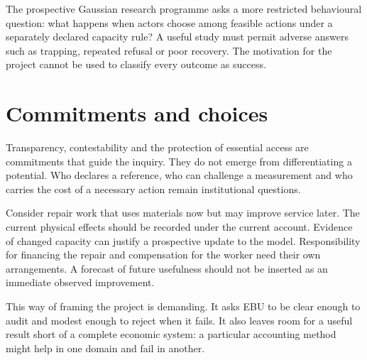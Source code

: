 The prospective Gaussian research programme asks a more restricted behavioural question: what happens when actors choose among feasible actions under a separately declared capacity rule? A useful study must permit adverse answers such as trapping, repeated refusal or poor recovery. The motivation for the project cannot be used to classify every outcome as success.

\section{Commitments and choices}
Transparency, contestability and the protection of essential access are commitments that guide the inquiry. They do not emerge from differentiating a potential. Who declares a reference, who can challenge a measurement and who carries the cost of a necessary action remain institutional questions.

Consider repair work that uses materials now but may improve service later. The current physical effects should be recorded under the current account. Evidence of changed capacity can justify a prospective update to the model. Responsibility for financing the repair and compensation for the worker need their own arrangements. A forecast of future usefulness should not be inserted as an immediate observed improvement.

This way of framing the project is demanding. It asks EBU to be clear enough to audit and modest enough to reject when it fails. It also leaves room for a useful result short of a complete economic system: a particular accounting method might help in one domain and fail in another.


